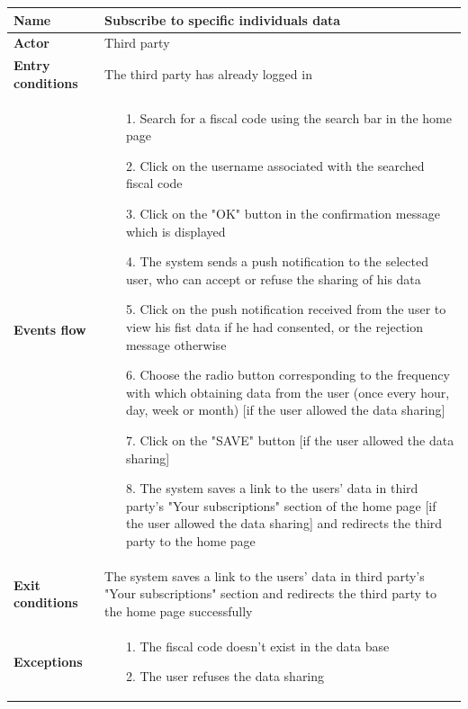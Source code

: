\begin{table}[]
\begin{adjustbox}{width=\textwidth}
\footnotesize
\begin{tabular}{|p{}|p{}|}
\hline
\textbf{Name}             &  Subscribe to specific individuals data\\ \hline
\textbf{Actor}            &  Third party\\ \hline
\textbf{Entry conditions} &  The third party has already logged in\\ \hline
\textbf{Events flow}      &
	\begin{itemize}
		\item[1.] Search for a fiscal code using the search bar in the home page
		\item[2.] Click on the username associated with the searched fiscal code
		\item[3.] Click on the "OK" button in the confirmation message which is displayed
		\item[4.] The system sends a push notification to the selected user, who can accept or refuse the sharing of his data
		\item[5.] Click on the push notification received from the user to view his fist data if he had consented, or the rejection message otherwise
		\item[6.] Choose the radio button corresponding to the frequency with which obtaining data from the user (once every hour, day, week or month) [if the user allowed the data sharing]
		\item[7.] Click on the "SAVE" button [if the user allowed the data sharing]
		\item[8.] The system saves a link to the users' data in third party's "Your subscriptions" section of the home page [if the user allowed the data sharing] and redirects the third party to the home page
	\end{itemize}\\ \hline
\textbf{Exit conditions}  &  The system saves a link to the users' data in third party's "Your subscriptions" section and redirects the third party to the home page successfully\\ \hline
\textbf{Exceptions}       &
	\begin{itemize}
		\item[1.] The fiscal code doesn't exist in the data base
		\item[2.] The user refuses the data sharing
	\end{itemize}\\ \hline
\end{tabular}
\end{adjustbox}
\end{table}

